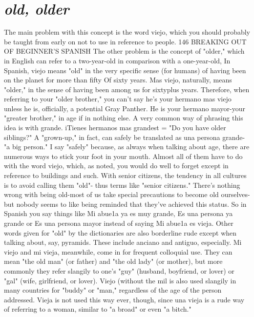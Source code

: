 \documentclass[14pt,a4paper,oneside]{memoir}
\begin{document}
\section{\emph{old, older}}

The main problem with this concept is the word viejo, which
you should probably be taught from early on not to use in reference
to people.
146 BREAKING OUT OF BEGINNER'S SPANISH
The other problem is the concept of "older," which in English
can refer to a two-year-old in comparison with a one-year-old, In Spanish, viejo means "old" in the very specific sense (for humans) of having
been on the planet for more than fifty Of sixty years. Mas viejo, naturally, means "older," in the sense of having been among us for sixtyplus years. Therefore, when referring to your "older brother," you can't
say he's your hermano mas viejo unless he is, officially, a potential
Gray Panther. He is your hermano mayor-your "greater brother," in
age if in nothing else. A very common way of phrasing this idea is with
grande. iTienes hermanos mas grandest = "Do you have older siblings?" A "grown-up," in fact, can safely be translated as una persona
grande-"a big person."
I say "safely" because, as always when talking about age, there
are numerous ways to stick your foot in your mouth. Almost all of
them have to do with the word viejo, which, as noted, you would do
well to forget except in reference to buildings and such. With senior
citizens, the tendency in all cultures is to avoid calling them "old"-
thus terms like "senior citizens." There's nothing wrong with being
old-most of us take special precautions to become old ourselves-but
nobody seems to like being reminded that they've achieved this status.
So in Spanish you say things like Mi abue1a ya es muy grande, Es
una persona ya grande or Es una persona mayor instead of saying Mi
abue1a es vieja. Other words given for "old" by the dictionaries are
also borderline rude except when talking about, say, pyramids. These
include anciano and antiguo, especially.
Mi viejo and mi vieja, meanwhile, come in for frequent colloquial use. They can mean "the old man" (or father) and "the old lady"
(or mother), but more commonly they refer slangily to one's "guy"
(husband, boyfriend, or lover) or "gal" (wife, girlfriend, or lover). Viejo
(without the mil is also used slangily in many countries for "buddy" or
"man," regardless of the age of the person addressed. Vieja is not used
this way ever, though, since una vieja is a rude way of referring to a
woman, similar to "a broad" or even "a bitch."
\end{document}
